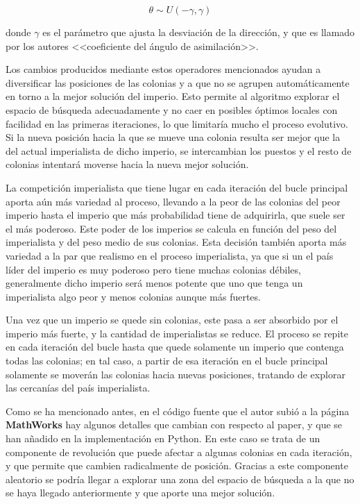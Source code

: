 \begin{equation}\label{ica-eq-desplazamiento2}
	\theta \sim U(-\gamma, \gamma)
\end{equation}

donde $\gamma$ es el parámetro que ajusta la desviación de la dirección, y que es llamado por los autores <<coeficiente del ángulo de asimilación>>.

Los cambios producidos mediante estos operadores mencionados ayudan a diversificar las posiciones de las colonias y a que no se agrupen automáticamente en torno a la mejor solución del imperio. Esto permite al algoritmo explorar el espacio de búsqueda adecuadamente y no caer en posibles óptimos locales con facilidad en las primeras iteraciones, lo que limitaría mucho el proceso evolutivo. Si la nueva posición hacia la que se mueve una colonia resulta ser mejor que la del actual imperialista de dicho imperio, se intercambian los puestos y el resto de colonias intentará moverse hacia la nueva mejor solución.

La competición imperialista que tiene lugar en cada iteración del bucle principal aporta aún más variedad al proceso, llevando a la peor de las colonias del peor imperio hasta el imperio que más probabilidad tiene de adquirirla, que suele ser el más poderoso. Este poder de los imperios se calcula en función del peso del imperialista y del peso medio de sus colonias. Esta decisión también aporta más variedad a la par que realismo en el proceso imperialista, ya que si un el país líder del imperio es muy poderoso pero tiene muchas colonias débiles, generalmente dicho imperio será menos potente que uno que tenga un imperialista algo peor y menos colonias aunque más fuertes.

Una vez que un imperio se quede sin colonias, este pasa a ser absorbido por el imperio más fuerte, y la cantidad de imperialistas se reduce. El proceso se repite en cada iteración del bucle hasta que quede solamente un imperio que contenga todas las colonias; en tal caso, a partir de esa iteración en el bucle principal solamente se moverán las colonias hacia nuevas posiciones, tratando de explorar las cercanías del país imperialista.

Como se ha mencionado antes, en el código fuente que el autor subió a la página \textbf{MathWorks} \cite{ica-matlab} hay algunos detalles que cambian con respecto al paper, y que se han añadido en la implementación en Python. En este caso se trata de un componente de revolución que puede afectar a algunas colonias en cada iteración, y que permite que cambien radicalmente de posición. Gracias a este componente aleatorio se podría llegar a explorar una zona del espacio de búsqueda a la que no se haya llegado anteriormente y que aporte una mejor solución.

